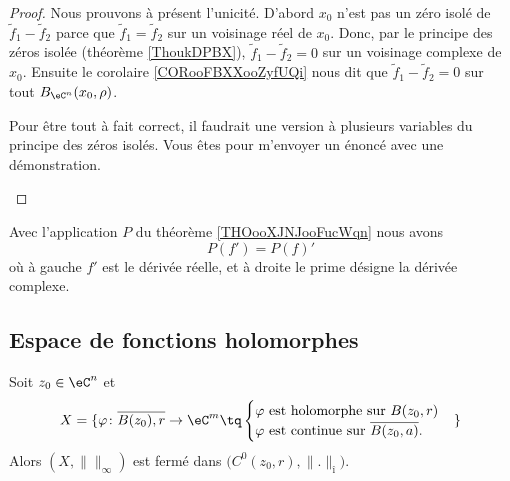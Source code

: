 \begin{proof}
	Nous prouvons à présent l'unicité. D'abord \( x_0\) n'est pas un zéro isolé de \( \tilde f_1-\tilde f_2\) parce que \( \tilde f_1=\tilde f_2\) sur un voisinage réel de \( x_0\). Donc, par le principe des zéros isolée (théorème \ref{ThoukDPBX}), \( \tilde f_1-\tilde f_2=0\) sur un voisinage complexe de \( x_0\). Ensuite le corolaire \ref{CORooFBXXooZyfUQi} nous dit que \( \tilde f_1-\tilde f_2=0\) sur tout \( B_{\eC^n}(x_0,\rho)\).

	\begin{probleme}
		Pour être tout à fait correct, il faudrait une version à plusieurs variables du principe des zéros isolés. Vous êtes  pour m'envoyer un énoncé avec une démonstration.
	\end{probleme}
\end{proof}

\begin{lemma}	\label{LEMooTVOAooUTyoCz}
	Avec l'application \( P\) du théorème \ref{THOooXJNJooFucWqn} nous avons
	\begin{equation}
		P(f')=P(f)'
	\end{equation}
	où à gauche \( f'\) est le dérivée réelle, et à droite le prime désigne la dérivée complexe.
\end{lemma}


\subsection{Espace de fonctions holomorphes}

\begin{proposition}	\label{PROPooFFXSooBLoTSq}
	Soit \( z_0\in \eC^n\) et
	\begin{equation}
		X=\{\varphi \colon\overline{B(z_0),r}\to \eC^{m}\tq
		\begin{cases}
			\varphi\text{ est holomorphe sur \( B(z_0,r)\)} \\
			\varphi\text{ est continue sur \( \overline{B(z_0,a)}\)}.
		\end{cases}
		\}
	\end{equation}
	Alors \( (X,\|  \|_{\infty})\) est fermé dans \( \big( C^0(z_0,r),\| . \|_{î} \big)\).
\end{proposition}


